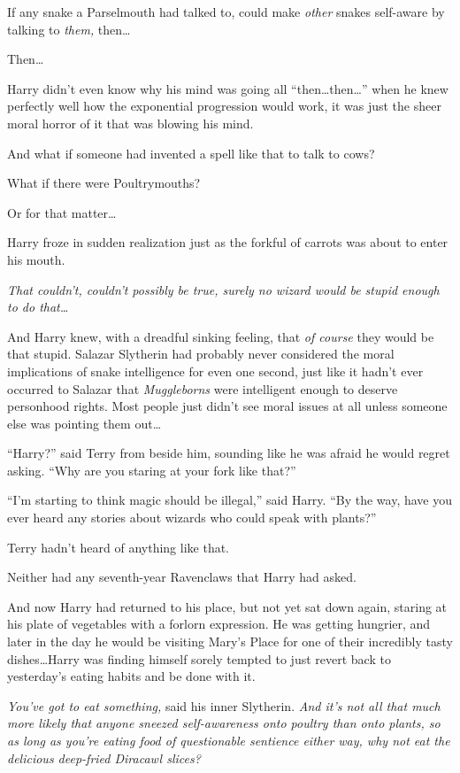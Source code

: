 If any snake a Parselmouth had talked to, could make \emph{other} snakes self-aware by talking to \emph{them,} then…

Then…

Harry didn’t even know why his mind was going all “then…then…” when he knew perfectly well how the exponential progression would work, it was just the sheer moral horror of it that was blowing his mind.

And what if someone had invented a spell like that to talk to cows?

What if there were Poultrymouths?

Or for that matter…

Harry froze in sudden realization just as the forkful of carrots was about to enter his mouth.

\emph{That couldn’t, couldn’t possibly be true, surely no wizard would be stupid enough to do \emph{that…}}

And Harry knew, with a dreadful sinking feeling, that \emph{of course} they would be that stupid. Salazar Slytherin had probably never considered the moral implications of snake intelligence for even one second, just like it hadn’t ever occurred to Salazar that \emph{Muggleborns} were intelligent enough to deserve personhood rights. Most people just didn’t see moral issues at all unless someone else was pointing them out…

“Harry?” said Terry from beside him, sounding like he was afraid he would regret asking. “Why are you staring at your fork like that?”

“I’m starting to think magic should be illegal,” said Harry. “By the way, have you ever heard any stories about wizards who could speak with plants?”

\later

Terry hadn’t heard of anything like that.

Neither had any seventh-year Ravenclaws that Harry had asked.

And now Harry had returned to his place, but not yet sat down again, staring at his plate of vegetables with a forlorn expression. He was getting hungrier, and later in the day he would be visiting Mary’s Place for one of their incredibly tasty dishes…Harry was finding himself sorely tempted to just revert back to yesterday’s eating habits and be done with it.

\emph{You’ve got to eat something,} said his inner Slytherin. \emph{And it’s not all that much \emph{more} likely that anyone sneezed self-awareness onto poultry than onto plants, so as long as you’re eating food of questionable sentience either way, why not eat the delicious deep-fried Diracawl slices?}

